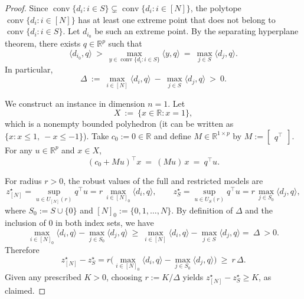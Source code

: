 \documentclass[accepted]{uai2026}
\theoremstyle{plain}
\theoremstyle{definition}
\newtheorem{assumption}[theorem]{Assumption}
\theoremstyle{remark}
\newcommand{\R}{\mathbb{R}}
\DeclareMathOperator{\conv}{conv}
\begin{document}
\begin{proof}
Since $\conv\{d_i : i\in S\}\subsetneq\conv\{d_i : i\in[N]\}$, the polytope
$\conv\{d_i : i\in[N]\}$ has at least one extreme point that does not belong to
$\conv\{d_i : i\in S\}$. Let $d_{i_0}$ be such an extreme point. By the
separating hyperplane theorem, there exists $q\in\R^p$ such that
\[
\langle d_{i_0},q\rangle\ >\ \max_{y\in \conv\{d_i : i\in S\}}\langle y,q\rangle
\ =\ \max_{j\in S}\langle d_j,q\rangle.
\]
In particular,
\[
\Delta\ :=\ \max_{i\in[N]}\langle d_i,q\rangle\ -\ \max_{j\in S}\langle d_j,q\rangle\ >\ 0.
\]

We construct an instance in dimension $n=1$. Let
\[
X\ :=\ \{x\in\R : x=1\},
\]
which is a nonempty bounded polyhedron (it can be written as
$\{x: x\le 1,\ -x\le -1\}$).
Take $c_0:=0\in\R$ and define $M\in\R^{1\times p}$ by $M:=\begin{bmatrix}q^\top\end{bmatrix}$.
For any $u\in\R^p$ and $x\in X$,
\[
(c_0+Mu)^\top x\ =\ (Mu)\,x\ =\ q^\top u.
\]

For radius $r>0$, the robust values of the full and restricted models are
\[
z_{[N]}^\star
=\sup_{u\in U_{[N]}(r)}q^\top u
= r\,\max_{i\in[N]_0}\langle d_i,q\rangle,
\qquad
z_S^\star
=\sup_{u\in U_S(r)}q^\top u
= r\,\max_{j\in S_0}\langle d_j,q\rangle,
\]
where $S_0:=S\cup\{0\}$ and $[N]_0:=\{0,1,\dots,N\}$.
By definition of $\Delta$ and the inclusion of $0$ in both index sets, we have
\[
\max_{i\in[N]_0}\langle d_i,q\rangle
-\max_{j\in S_0}\langle d_j,q\rangle
\ \ge\
\max_{i\in[N]}\langle d_i,q\rangle
-\max_{j\in S}\langle d_j,q\rangle
=\ \Delta\ > 0.
\]
Therefore
\[
z_{[N]}^\star - z_S^\star
= r\Big(\max_{i\in[N]_0}\langle d_i,q\rangle
-\max_{j\in S_0}\langle d_j,q\rangle\Big)
\ \ge\ r\,\Delta.
\]
Given any prescribed $K>0$, choosing $r:=K/\Delta$ yields
$z_{[N]}^\star - z_S^\star \ge K$, as claimed.
\end{proof}



\end{document}
